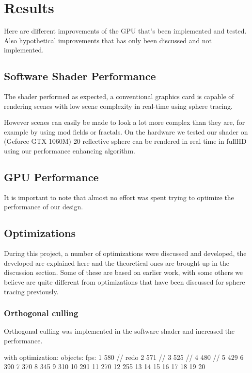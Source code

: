 \chapter{Results}

	Here are different improvements of the GPU that's been implemented and tested.
	Also hypothetical improvements that has only been discussed and not
	implemented.

	\section{Software Shader Performance}

		The shader performed as expected, a conventional graphics card is 
		capable of rendering scenes with low scene complexity in real-time
		using sphere tracing.

		However scenes can easily be made to look a lot more complex than they 
		are, for example by using mod fields or fractals. On the hardware we 
		tested our shader on (Geforce GTX 1060M) 20 reflective sphere can
		be rendered in real time in fullHD using our performance enhancing 
		algorithm.


	\section{GPU Performance}
		
		It is important to note that almost no effort was spent trying to
		optimize the performance of our design.

	\section{Optimizations}
		
		During this project, a number of optimizations were discussed and 
		developed, the developed are explained here and the theoretical ones
		are brought up in the discussion section. Some of these are based on earlier
		work, with some others we believe are quite different from optimizations
		that have been discussed for sphere tracing previously.

		\subsection{Orthogonal culling}
			Orthogonal culling was implemented in the software shader and increased 
			the performance.


			with optimization:
			objects:	fps:
			1			580	// redo
			2			571	//
			3			525	//
			4			480 //
			5			429
			6			390
			7			370
			8			345
			9			310
			10			291
			11			270
			12			255
			13			
			14
			15
			16
			17
			18
			19
			20



		
		
		

